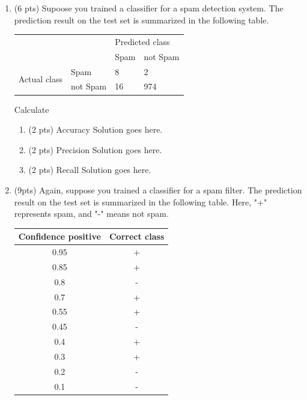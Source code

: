 \documentclass[a4paper]{article}
\theoremstyle{definition}
\newenvironment{soln}{
    \leavevmode\color{blue}\ignorespaces
}{}
\begin{document}
\begin{enumerate}
\begin{enumerate}
\end{enumerate}

\item (6 pts) Supoose you trained a classifier for a spam detection system. The prediction result on the test set is summarized in the following table.
\begin{center}
	\begin{tabular}{l l | l l}
		&          & \multicolumn{2}{l}{Predicted class} \\
		&          & Spam           & not Spam           \\
		\hline
		\multirow{2}{*}{Actual class} & Spam     & 8              & 2                  \\
		& not Spam & 16             & 974               
	\end{tabular}
\end{center}

Calculate
\begin{enumerate}
	\item (2 pts) Accuracy
	\begin{soln}  Solution goes here. \end{soln}
	\item (2 pts) Precision
	\begin{soln}  Solution goes here. \end{soln}
	\item (2 pts) Recall
	\begin{soln}  Solution goes here. \end{soln}
\end{enumerate}


\item (9pts) Again, suppose you trained a classifier for a spam filter. The prediction result on the test set is summarized in the following table. Here, "+" represents spam, and "-" means not spam.

\begin{center}
\begin{tabular}{ c  c }
\hline
Confidence positive & Correct class \\ \hline
0.95 & + \\
0.85 & + \\
0.8 & - \\
0.7 & + \\
0.55 & + \\
0.45 & - \\
0.4 & + \\
0.3 & + \\
0.2 & - \\
0.1 & - \\
\hline
\end{tabular}
\end{center}


\end{enumerate}
\end{document}
